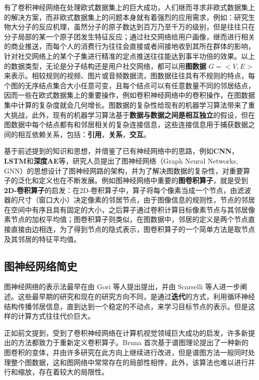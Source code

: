 \documentclass[UTF8]{ctexart}
\begin{document}
有了卷积神经网络在处理欧式数据集上的巨大成功，人们继而寻求非欧式数据集上的解决方案，而非欧式数据集上的问题本身就有着强烈的应用需求，例如：研究生物大分子的反应机理，虽然分子的原子数达到百万乃至千万的级别，但是往往只在分子局部的某一个原子团发生特征反应；通过社交网络给用户画像，继而进行相关的商业推送，而每个人的消费行为往往会直接或者间接地收到其所在群体的影响，针对社交网络上的某个子集进行精准的定点推送往往能达到事半功倍的效果。以上的数据类型，无论是分子结构还是用户社交网络，都可以用\textbf{图数据} $G=<V,E>$来表示。相较规则的视频、图片或音频数据流，图数据往往具有不规则的特点，每个图的无序结点集合大小任意可变，且每个结点可以有任意数量不同的邻居结点，因而一些在欧式数据集上的重要操作，例如卷积神经网络中的卷积操作，在图数据集中计算的复杂度就会几何增长。图数据的复杂性给现有的机器学习算法带来了重大挑战，此外，现有的机器学习算法基于\textbf{数据与数据之间是相互独立}的假设，但在图数据中每个结点都有和邻居相关的复杂连接信息，这些连接信息用于捕获数据之间的相互依赖关系，包括：\textbf{引用}，\textbf{关系}，\textbf{交互}。

基于前述提到的知识和思想，并借鉴了已有神经网络中的思路，例如\textbf{CNN}，\textbf{LSTM}和\textbf{深度AE}等，研究人员提出了图神经网络（Graph Neural Networks, GNN）的思想设计了图神经网路的架构，并为了解决图数据的复杂性，对重要算子的泛化和定义也在不断发展。例如图神经网络中重要的\textbf{图卷积算子}，就是受到\textbf{2D-卷积算子}的启发：在2D-卷积算子中，算子将每个像素当成一个节点，由滤波器的尺寸（窗口大小）决定像素的邻居节点，由于图像信息的规则性，节点的邻居在空间中有序且具有固定的大小，之后算子通过卷积计算目标像素节点与其邻居像素节点的加权平均值；图卷积算子则类似，在图数据中，邻居的定义是两个节点直接直接由边相连，为了得到节点的隐式表示，图卷积算子的一个简单方法是取节点及其邻居的特征平均值。 \par

\subsection{图神经网络简史}

图神经网络的表示法最早在由 Gori 等人提出提出，并由 Scarselli 等人进一步阐述。这些最早期的研究和现在的研究方向不同，是通过\textbf{迭代}的方式，利用循环神经结构传播邻居信息，直到达到一个稳定的不动点，来学习目标节点的表示。但是这样的计算方式往往代价巨大。\par

正如前文提到，受到了卷积神经网络在计算机视觉领域巨大成功的启发，许多新提出的方法都致力于重新定义卷积算子。Bruna 首次基于谱图理论提出了一种新的图卷积的变体，并由许多研究在此方向上继续进行改进，但是谱图方法一般同时处理整个图数据，这和图网络中常常存在的局部性相悖，此外，该算法也难以进行并行和缩放，存在着较大的局限性。 \par
\end{document}
